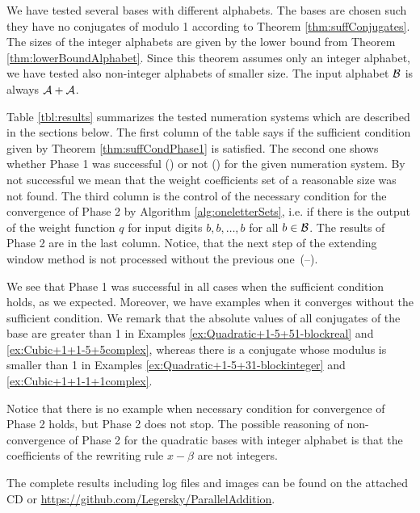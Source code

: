 We have tested several bases with different alphabets. The bases are chosen such they have no conjugates of modulo 1 according to Theorem \ref{thm:suffConjugates}. The sizes of the integer alphabets are given by the lower bound from Theorem \ref{thm:lowerBoundAlphabet}. Since this theorem assumes only an integer alphabet, we have tested also non-integer alphabets of smaller size. The input alphabet $\mathcal{B}$ is always $\mathcal{A}+ \mathcal{A}$.  

 Table \ref{tbl:results} summarizes the tested numeration systems which are described in the sections below. The first column of the table says if the sufficient condition given by Theorem \ref{thm:suffCondPhase1} is satisfied. The second one shows whether Phase 1 was successful (\checkmark) or not (\xmark) for the given numeration system. By not successful we mean that the weight coefficients set of a reasonable size was not found. The third column is the control of the necessary condition for the convergence of Phase 2 by Algorithm \ref{alg:oneletterSets}, i.e. if there is the output of the weight function $q$ for input digits $b,b,\dots,b$ for all $b\in\mathcal{B}$. The results of Phase 2 are in the last column. Notice, that the next step of the extending window method is not processed without the previous one~(--).

We see that Phase 1 was successful in all cases when the sufficient condition holds, as we expected. Moreover, we have examples when it converges without the sufficient condition. We remark that the absolute values of all conjugates of the base are greater than 1 in Examples \ref{ex:Quadratic+1-5+51-blockreal} and \ref{ex:Cubic+1+1-5+5complex}, whereas there is a conjugate whose modulus is smaller than 1 in Examples \ref{ex:Quadratic+1-5+31-blockinteger} and \ref{ex:Cubic+1+1-1+1complex}.

Notice that there is no example when necessary condition for convergence of Phase 2 holds, but Phase 2 does not stop. The possible reasoning of non-convergence of Phase 2 for the quadratic bases with integer alphabet is that the coefficients of the rewriting rule $x-\beta$ are not integers.  

The complete results including log files and images can be found on the attached CD  or \url{https://github.com/Legersky/ParallelAddition}.

